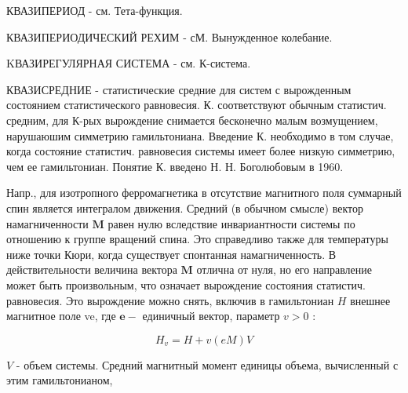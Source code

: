 \documentclass[10pt]{article}
\begin{document}
КВАЗИПЕРИОД - см. Тета-функция.



КВАЗИПЕРИОДИЧЕСКИЙ РЕХИМ - сМ. Вынужденное колебание.



KВАЗИРЕГУЛЯРНАЯ СИСТЕМА - см. К-система.



КВАЗИСРЕДНИЕ - статистические средние для систем с вырожденным состоянием статистического равновесия. К. соответствуют обычным статистич. средним, для К-рых вырождение снимается бесконечно малым возмущением, нарушаюшим симметрию гамильтониана. Введение К. необходимо в том случае, когда состояние статистич. равновесия системы имеет более низкую симметрию, чем ее гамильтониан. Понятие К. введено Н. Н. Боголюбовым в 1960.



Напр., для изотропного ферромагнетика в отсутствие магнитного поля суммарный спин является интегралом движения. Средний (в обычном смысле) вектор намагниченности $\boldsymbol{M}$ равен нулю вследствие инвариантности системы по отношению к группе вращений спина. Это справедливо также для температуры ниже точки Кюри, когда существует спонтанная намагниченность. В действительности величина вектора $\boldsymbol{M}$ отлична от нуля, но его направление может быть произвольным, что означает вырождение состояния статистич. равновесия. Это вырождение можно снять, включив в гамильтониан $H$ внешнее магнитное поле ve, где $\boldsymbol{e}-$ единичный вектор, параметр $v>0$ :



\[

H_{v}=H+v(e M) V

\]



$V$ - объем системы. Средний магнитный момент единицы объема, вычисленный с этим гамильтонианом,
\end{document}
